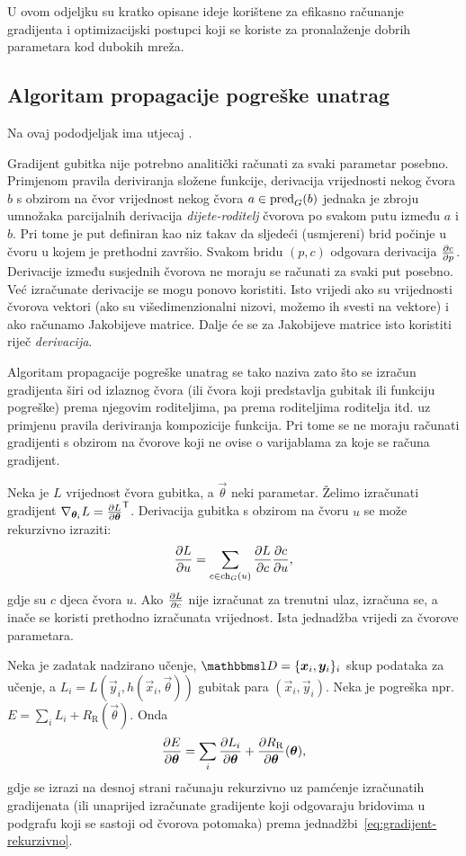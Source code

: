 \documentclass[utf8, diplomski, lmodern]{fer}
\begin{document}
U ovom odjeljku su kratko opisane ideje korištene za efikasno računanje gradijenta i optimizacijski postupci koji se koriste za pronalaženje dobrih parametara kod dubokih mreža.

\subsection{Algoritam propagacije pogreške unatrag}

Na ovaj pododjeljak ima utjecaj \cite{Olah:2015:CCGB}.

Gradijent gubitka nije potrebno analitički računati za svaki parametar posebno. Primjenom pravila deriviranja složene funkcije, derivacija vrijednosti nekog čvora $b$ s obzirom na čvor vrijednost nekog čvora $a\in\mathrm{pred}_G(b)$ jednaka je zbroju umnožaka parcijalnih derivacija \textit{dijete-roditelj} čvorova po svakom putu između $a$ i $b$. Pri tome je put definiran kao niz takav da sljedeći (usmjereni) brid počinje u čvoru u kojem je prethodni završio. Svakom bridu $(p,c)$ odgovara derivacija $\pd{c}{p}$. Derivacije između susjednih čvorova ne moraju se računati za svaki put posebno. Već izračunate derivacije se mogu ponovo koristiti. Isto vrijedi ako su vrijednosti čvorova vektori (ako su višedimenzionalni nizovi, možemo ih svesti na vektore) i ako računamo Jakobijeve matrice. Dalje će se za Jakobijeve matrice isto koristiti riječ \textit{derivacija}.

Algoritam propagacije pogreške unatrag se tako naziva zato što se izračun gradijenta širi od izlaznog čvora (ili čvora koji predstavlja gubitak ili funkciju pogreške) prema njegovim roditeljima, pa prema roditeljima roditelja itd. uz primjenu pravila deriviranja kompozicije funkcija. Pri tome se ne moraju računati gradijenti s obzirom na čvorove koji ne ovise o varijablama za koje se računa gradijent.

Neka je $L$ vrijednost čvora gubitka, a $\vec\theta$ neki parametar. Želimo izračunati gradijent $\nabla_{\vec\theta_i}L=\pd{L}{\vec\theta}^\tp$. Derivacija gubitka s obzirom na čvoru $u$ se može rekurzivno izraziti: 
\begin{align} \label{eq:gradijent-rekurzivno}
\pd{L}{u} = \sum_{c\in\ch_G(u)} \pd{L}{c}\pd{c}{u}	\text{,}
\end{align}
gdje su $c$ djeca čvora $u$. Ako $\pd{L}{c}$ nije izračunat za trenutni ulaz, izračuna se, a inače se koristi prethodno izračunata vrijednost. Ista jednadžba vrijedi za čvorove parametara.

Neka je zadatak nadzirano učenje, $\set D=\cbr{\vec x_i, \vec y_i}_i$ skup podataka za učenje, a $L_i=L(\vec y_i, h(\vec x_i,\vec \theta))$ gubitak para $(\vec x_i, \vec y_i)$. Neka je pogreška npr. $E=\sum_i L_i + R_\text{R}(\vec\theta)$. Onda
\begin{align}
\pd{E}{\vec\theta} 
= \sum_{i} \pd{L_i}{\vec\theta} + \pd{R_\text{R}}{\vec\theta}\del{\vec\theta} \text{,}
\end{align}
gdje se izrazi na desnoj strani računaju rekurzivno uz pamćenje izračunatih gradijenata (ili unaprijed izračunate gradijente koji odgovaraju bridovima u podgrafu koji se sastoji od čvorova potomaka) prema jednadžbi~\ref{eq:gradijent-rekurzivno}.
\end{document}
